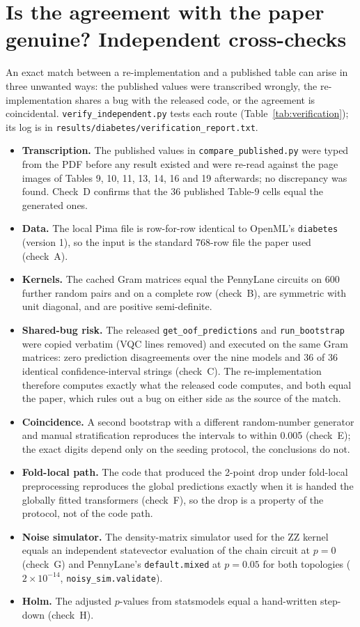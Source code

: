 \documentclass[11pt,a4paper]{article}
\newcommand{\code}[1]{\texttt{\small #1}}
\begin{document}
\section{Is the agreement with the paper genuine? Independent cross-checks}
\label{sec:verify}
An exact match between a re-implementation and a published table can arise in three unwanted ways: the published values were transcribed wrongly, the re-implementation shares a bug with the released code, or the agreement is coincidental. \code{verify\_independent.py} tests each route (Table~\ref{tab:verification}); its log is in \code{results/diabetes/verification\_report.txt}.
\begin{itemize}[nosep]
  \item \textbf{Transcription.} The published values in \code{compare\_published.py} were typed from the PDF before any result existed and were re-read against the page images of Tables 9, 10, 11, 13, 14, 16 and 19 afterwards; no discrepancy was found. Check~D confirms that the 36 published Table-9 cells equal the generated ones.
  \item \textbf{Data.} The local Pima file is row-for-row identical to OpenML's \code{diabetes} (version 1), so the input is the standard 768-row file the paper used (check~A).
  \item \textbf{Kernels.} The cached Gram matrices equal the PennyLane circuits on 600 further random pairs and on a complete row (check~B), are symmetric with unit diagonal, and are positive semi-definite.
  \item \textbf{Shared-bug risk.} The released \code{get\_oof\_predictions} and \code{run\_bootstrap} were copied verbatim (VQC lines removed) and executed on the same Gram matrices: zero prediction disagreements over the nine models and 36 of 36 identical confidence-interval strings (check~C). The re-implementation therefore computes exactly what the released code computes, and both equal the paper, which rules out a bug on either side as the source of the match.
  \item \textbf{Coincidence.} A second bootstrap with a different random-number generator and manual stratification reproduces the intervals to within 0.005 (check~E); the exact digits depend only on the seeding protocol, the conclusions do not.
  \item \textbf{Fold-local path.} The code that produced the 2-point drop under fold-local preprocessing reproduces the global predictions exactly when it is handed the globally fitted transformers (check~F), so the drop is a property of the protocol, not of the code path.
  \item \textbf{Noise simulator.} The density-matrix simulator used for the ZZ kernel equals an independent statevector evaluation of the chain circuit at $p=0$ (check~G) and PennyLane's \code{default.mixed} at $p=0.05$ for both topologies ($2\times10^{-14}$, \code{noisy\_sim.validate}).
  \item \textbf{Holm.} The adjusted $p$-values from statsmodels equal a hand-written step-down (check~H).
\end{itemize}
\end{document}

